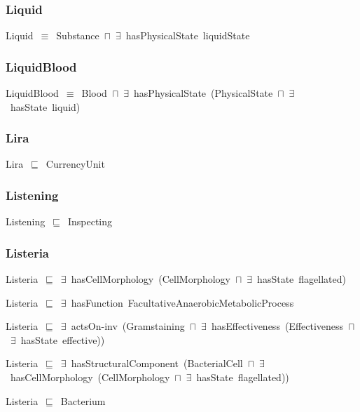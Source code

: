 \documentclass{article}
\begin{document}
\subsubsection*{Liquid}

Liquid~\ensuremath{\equiv}~Substance~\ensuremath{\sqcap}~\ensuremath{\exists}~hasPhysicalState~liquidState

\subsubsection*{LiquidBlood}

LiquidBlood~\ensuremath{\equiv}~Blood~\ensuremath{\sqcap}~\ensuremath{\exists}~hasPhysicalState~(PhysicalState~\ensuremath{\sqcap}~\ensuremath{\exists}~hasState~liquid)

\subsubsection*{Lira}

Lira~\ensuremath{\sqsubseteq}~CurrencyUnit~

\subsubsection*{Listening}

Listening~\ensuremath{\sqsubseteq}~Inspecting~

\subsubsection*{Listeria}

Listeria~\ensuremath{\sqsubseteq}~\ensuremath{\exists}~hasCellMorphology~(CellMorphology~\ensuremath{\sqcap}~\ensuremath{\exists}~hasState~flagellated)~

Listeria~\ensuremath{\sqsubseteq}~\ensuremath{\exists}~hasFunction~FacultativeAnaerobicMetabolicProcess~

Listeria~\ensuremath{\sqsubseteq}~\ensuremath{\exists}~actsOn-inv~(Gramstaining~\ensuremath{\sqcap}~\ensuremath{\exists}~hasEffectiveness~(Effectiveness~\ensuremath{\sqcap}~\ensuremath{\exists}~hasState~effective))~

Listeria~\ensuremath{\sqsubseteq}~\ensuremath{\exists}~hasStructuralComponent~(BacterialCell~\ensuremath{\sqcap}~\ensuremath{\exists}~hasCellMorphology~(CellMorphology~\ensuremath{\sqcap}~\ensuremath{\exists}~hasState~flagellated))~

Listeria~\ensuremath{\sqsubseteq}~Bacterium~
\end{document}
